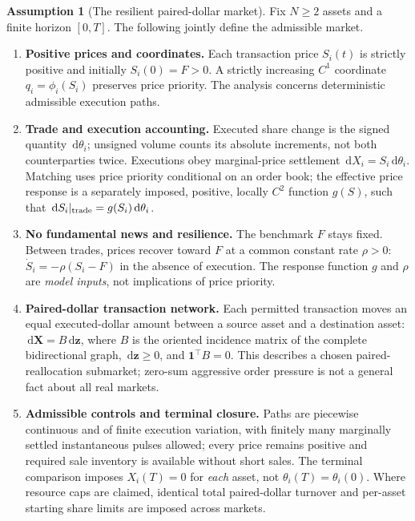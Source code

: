 \documentclass[11pt]{article}
\numberwithin{equation}{section}
\theoremstyle{definition}
\newtheorem{assumption}[theorem]{Assumption}
\theoremstyle{remark}
\newcommand{\dd}{\,\mathrm{d}}
\newcommand{\one}{\mathbf{1}}
\begin{document}
\begin{assumption}[The resilient paired-dollar market]\label{asmp:model}
Fix $N\ge2$ assets and a finite horizon $[0,T]$. The following jointly define the admissible market.
\begin{enumerate}[label=\textup{(M\arabic*)},leftmargin=2.9em,itemsep=0.20em]
\item \textbf{Positive prices and coordinates.} Each transaction price $S_i(t)$ is strictly positive and initially $S_i(0)=F>0$. A strictly increasing $C^1$ coordinate $q_i=\phi_i(S_i)$ preserves price priority. The analysis concerns deterministic admissible execution paths.
\item \textbf{Trade and execution accounting.} Executed share change is the signed quantity $\dd\theta_i$; unsigned volume counts its absolute increments, not both counterparties twice. Executions obey marginal-price settlement $\dd X_i=S_i\dd\theta_i$. Matching uses price priority conditional on an order book; the effective price response is a separately imposed, positive, locally $C^2$ function $g(S)$, such that $\dd S_i|_{\rm trade}=g(S_i)\dd\theta_i$.
\item \textbf{No fundamental news and resilience.} The benchmark $F$ stays fixed. Between trades, prices recover toward $F$ at a common constant rate $\rho>0$: $\dot S_i=-\rho(S_i-F)$ in the absence of execution. The response function $g$ and $\rho$ are \emph{model inputs}, not implications of price priority.
\item \textbf{Paired-dollar transaction network.} Each permitted transaction moves an equal executed-dollar amount between a source asset and a destination asset: $\dd\bm X=B\dd\bm z$, where $B$ is the oriented incidence matrix of the complete bidirectional graph, $\dd\bm z\ge0$, and $\one^\top B=0$. This describes a chosen paired-reallocation submarket; zero-sum aggressive order pressure is not a general fact about all real markets.
\item \textbf{Admissible controls and terminal closure.} Paths are piecewise continuous and of finite execution variation, with finitely many marginally settled instantaneous pulses allowed; every price remains positive and required sale inventory is available without short sales. The terminal comparison imposes $X_i(T)=0$ for \emph{each} asset, not $\theta_i(T)=\theta_i(0)$. Where resource caps are claimed, identical total paired-dollar turnover and per-asset starting share limits are imposed across markets.
\end{enumerate}
\end{assumption}
\end{document}
